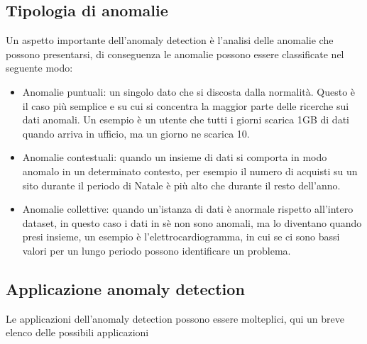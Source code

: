 \subsection{Tipologia di anomalie}
Un aspetto importante dell'anomaly detection è l'analisi delle anomalie che possono presentarsi, di conseguenza le anomalie possono essere classificate nel seguente modo:
\begin{itemize}
    \item Anomalie puntuali: un singolo dato che si discosta dalla normalità. Questo è il caso più semplice e su cui si concentra la maggior parte delle ricerche sui dati anomali. Un esempio è un utente che tutti i giorni scarica 1GB di dati quando arriva in ufficio, ma un giorno ne scarica 10.
    \item Anomalie contestuali: quando un insieme di dati si comporta in modo anomalo in un determinato contesto, per esempio il numero di acquisti su un sito durante il periodo di Natale è più alto che durante il resto dell'anno.
    \item Anomalie collettive: quando un'istanza di dati è anormale rispetto all'intero dataset, in questo caso i dati in sè non sono anomali, ma lo diventano quando presi insieme, un esempio è l'elettrocardiogramma, in cui se ci sono bassi valori per un lungo periodo possono identificare un problema.
\end{itemize}

\subsection{Applicazione anomaly detection}

Le applicazioni dell'anomaly detection possono essere molteplici, qui un breve elenco delle possibili applicazioni \cite{anomaly_detection_survey_3}

